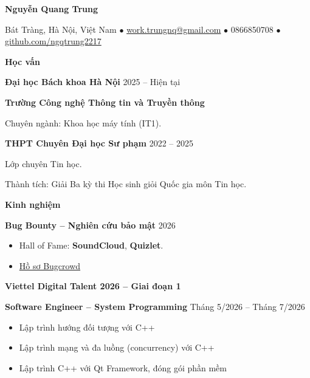 \documentclass[11pt]{article}
\begin{document}
\begin{center}
    \textbf{Nguyễn Quang Trung}\\
    \hrulefill
\end{center}

\begin{center}
    Bát Tràng, Hà Nội, Việt Nam $\bullet$ \href{mailto:work.trungnq@gmail.com}{work.trungnq@gmail.com} $\bullet$ 0866850708 $\bullet$ \href{https://github.com/ngqtrung2217}{github.com/ngqtrung2217}
\end{center}

\vspace{0.5pt}

\begin{center}
    \textbf{Học vấn}
\end{center}

\textbf{Đại học Bách khoa Hà Nội} \hfill 2025 -- Hiện tại

\textbf{Trường Công nghệ Thông tin và Truyền thông}

Chuyên ngành: Khoa học máy tính (IT1).

\vspace{12pt}

\textbf{THPT Chuyên Đại học Sư phạm} \hfill 2022 -- 2025

Lớp chuyên Tin học.

Thành tích: Giải Ba kỳ thi Học sinh giỏi Quốc gia môn Tin học.

\vspace{12pt}

\begin{center}
    \textbf{Kinh nghiệm}
\end{center}

\vspace{12pt}

\textbf{Bug Bounty -- Nghiên cứu bảo mật} \hfill 2026
\begin{itemize}[noitemsep, topsep=0pt, partopsep=0pt, parsep=0pt]
    \item Hall of Fame: \textbf{SoundCloud}, \textbf{Quizlet}.
    \item \href{https://bugcrowd.com/0xtrung}{Hồ sơ Bugcrowd}
\end{itemize}
\vspace{12pt}

\textbf{Viettel Digital Talent 2026 -- Giai đoạn 1}

\textbf{Software Engineer -- System Programming} \hfill Tháng 5/2026 -- Tháng 7/2026
\begin{itemize}[noitemsep, topsep=0pt, partopsep=0pt, parsep=0pt]
    \item Lập trình hướng đối tượng với C++
    \item Lập trình mạng và đa luồng (concurrency) với C++
    \item Lập trình C++ với Qt Framework, đóng gói phần mềm
\end{itemize}
\end{document}
